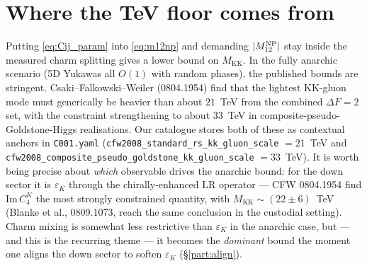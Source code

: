 \documentclass[11pt]{article}
\newcommand{\MKK}{M_{\mathrm{KK}}}
\newcommand{\eps}{\varepsilon}
\newcommand{\code}[1]{\texttt{#1}}
\newcommand{\Mtwelve}{M_{12}}
\theoremstyle{definition}
\begin{document}
\section{Where the TeV floor comes from}
\label{sec:floor}

Putting \eqref{eq:Cij_param} into \eqref{eq:m12np} and demanding
$|\Mtwelve^{\rm NP}|$ stay inside the measured charm splitting gives a lower
bound on $\MKK$. In the fully anarchic scenario (5D Yukawas all $O(1)$ with
random phases), the published bounds are stringent. Csaki--Falkowski--Weiler
(0804.1954) find that the lightest KK-gluon mode must generically be heavier
than about $21$~TeV from the combined $\Delta F=2$ set, with the constraint
strengthening to about $33$~TeV in composite-pseudo-Goldstone-Higgs realisations.
Our catalogue stores both of these as contextual anchors in \code{C001.yaml}
(\code{cfw2008\_standard\_rs\_kk\_gluon\_scale} $=21$~TeV and
\code{cfw2008\_composite\_pseudo\_goldstone\_kk\_gluon\_scale} $=33$~TeV). It is
worth being precise about \emph{which} observable drives the anarchic bound: for
the down sector it is $\eps_K$ through the chirally-enhanced LR operator --- CFW
0804.1954 find $\mathrm{Im}\,C_4^K$ the most strongly constrained quantity, with
$\MKK\sim(22\pm6)$~TeV (Blanke et al., 0809.1073, reach the same conclusion in
the custodial setting). Charm mixing is somewhat less restrictive than
$\eps_K$ in the anarchic case, but --- and this is the recurring theme --- it
becomes the \emph{dominant} bound the moment one aligns the down sector to soften
$\eps_K$ (\S\ref{part:align}).
\end{document}
